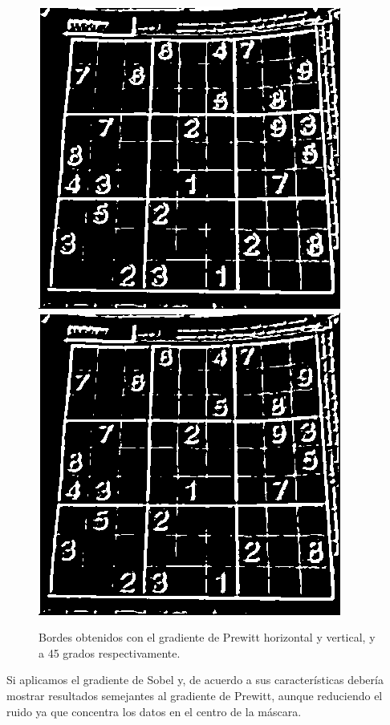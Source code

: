 \documentclass[conference]{IEEEtran}
\begin{document}
\begin{figure}[h]
	\centering
	\setlength{\unitlength}{0.00105in}
	\includegraphics[scale=0.43]{./images/prewittXY.png}
	\includegraphics[scale=0.43]{./images/prewitt45.png}
	\caption{Bordes obtenidos con el gradiente de Prewitt horizontal y vertical, y a 45 grados respectivamente. }
\end{figure}

Si aplicamos el gradiente de Sobel y, de acuerdo a sus caracter\'isticas deber\'ia mostrar resultados semejantes al gradiente de Prewitt, aunque reduciendo el ruido ya que concentra los datos en el centro de la m\'ascara.
\end{document}
